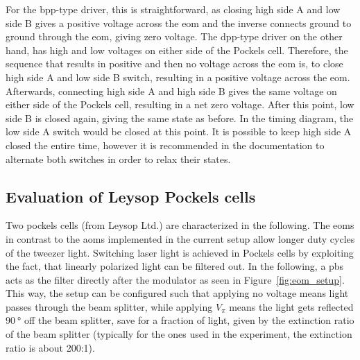 For the bpp-type driver, this is straightforward, as closing high side A and low side B gives a positive voltage across the \ac{eom} and the inverse connects ground to ground through the \ac{eom}, giving zero voltage. The dpp-type driver on the other hand, has high and low voltages on either side of the Pockels cell. Therefore, the sequence that results in positive and then no voltage across the \ac{eom} is, to close high side A and low side B switch, resulting in a positive voltage across the \ac{eom}. Afterwards, connecting high side A and high side B gives the same voltage on either side of the Pockels cell, resulting in a net zero voltage. After this point, low side B is closed again, giving the same state as before. In the timing diagram, the low side A switch would be closed at this point. It is possible to keep high side A closed the entire time, however it is recommended in the documentation to alternate both switches in order to relax their states.

\begin{figure}[t]%
\end{figure}

\subsection{Evaluation of Leysop Pockels cells}

Two pockels cells (from Leysop Ltd.) are characterized in the following. The \acp{eom} in contrast to the \acp{aom} implemented in the current setup allow longer duty cycles of the tweezer light. Switching laser light is achieved in Pockels cells by exploiting the fact, that linearly polarized light can be filtered out. In the following, a \ac{pbs} acts as the filter directly after the modulator as seen in Figure~\ref{fig:eom_setup}. This way, the setup can be configured such that applying no voltage means light passes through the beam splitter, while applying $V_\pi$ means the light gets reflected $\SI{90}{\degree}$ off the beam splitter, save for a fraction of light, given by the extinction ratio of the beam splitter (typically for the ones used in the experiment, the extinction ratio is about 200:1).

